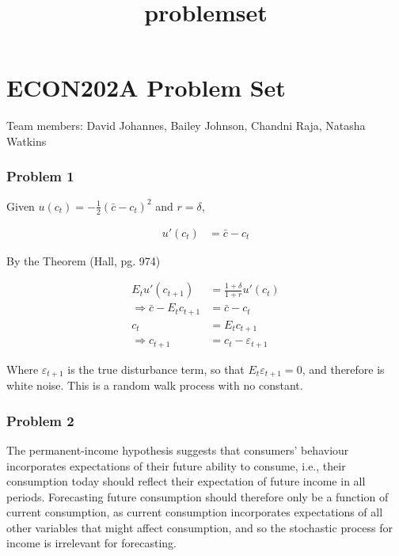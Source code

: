 \documentclass[11pt]{article}
\title{problemset}
\begin{document}
    
    \maketitle
    
    

    
    \hypertarget{econ202a-problem-set}{%
\section{ECON202A Problem Set}\label{econ202a-problem-set}}

Team members: David Johannes, Bailey Johnson, Chandni Raja, Natasha
Watkins

    \hypertarget{problem-1}{%
\subsubsection{Problem 1}\label{problem-1}}

Given \(u(c_t) = -\frac{1}{2} (\bar{c} - c_t)^2\) and \(r = \delta\),

\begin{align*}
    u'(c_t) &= \bar{c} - c_t
\end{align*}

By the Theorem (Hall, pg. 974)

\begin{align*}
    E_t u'(c_{t+1}) &= \frac{1+\delta}{1+r} u'(c_t) \\
    \Rightarrow \bar{c} - E_t c_{t+1} &= \bar{c} - c_t \\
    c_t &= E_t c_{t+1} \\
    \Rightarrow c_{t+1} &= c_t - \varepsilon_{t+1}
\end{align*}

Where \(\varepsilon_{t+1}\) is the true disturbance term, so that
\(E_t \varepsilon_{t+1} = 0\), and therefore is white noise. This is a
random walk process with no constant.

    \hypertarget{problem-2}{%
\subsubsection{Problem 2}\label{problem-2}}

The permanent-income hypothesis suggests that consumers' behaviour
incorporates expectations of their future ability to consume, i.e.,
their consumption today should reflect their expectation of future
income in all periods. Forecasting future consumption should therefore
only be a function of current consumption, as current consumption
incorporates expectations of all other variables that might affect
consumption, and so the stochastic process for income is irrelevant for
forecasting.
\end{document}
